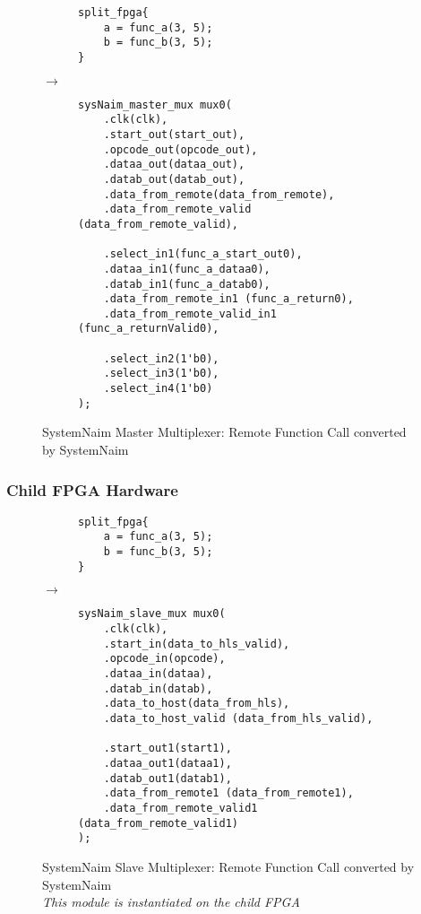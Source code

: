 \begin{figure}[H]
\centering
\begin{subfigure}{0.32\textwidth}
    \centering
    \begin{verbatim}
split_fpga{
    a = func_a(3, 5);
    b = func_b(3, 5);
}
\end{verbatim}
\end{subfigure}%
{\LARGE$\rightarrow$}%
\begin{subfigure}{0.58\textwidth}
    \begin{verbatim}
sysNaim_master_mux mux0(
    .clk(clk),
    .start_out(start_out),
    .opcode_out(opcode_out),
    .dataa_out(dataa_out),
    .datab_out(datab_out),
    .data_from_remote(data_from_remote),
    .data_from_remote_valid (data_from_remote_valid),

    .select_in1(func_a_start_out0),
    .dataa_in1(func_a_dataa0),
    .datab_in1(func_a_datab0),
    .data_from_remote_in1 (func_a_return0),
    .data_from_remote_valid_in1 (func_a_returnValid0),

    .select_in2(1'b0),
    .select_in3(1'b0),
    .select_in4(1'b0)
);
    \end{verbatim}
\end{subfigure}
\caption{SystemNaim Master Multiplexer: Remote Function Call converted by SystemNaim}
\label{sn:rmt_func_call_mst_mux}
\end{figure}

\subsubsection{Child FPGA Hardware}

\begin{figure}[H]
\centering
\begin{subfigure}{0.32\textwidth}
    \centering
    \begin{verbatim}
split_fpga{
    a = func_a(3, 5);
    b = func_b(3, 5);
}
\end{verbatim}
\end{subfigure}%
{\LARGE$\rightarrow$}%
\begin{subfigure}{0.58\textwidth}
    \begin{verbatim}
sysNaim_slave_mux mux0(
    .clk(clk),
    .start_in(data_to_hls_valid),
    .opcode_in(opcode),
    .dataa_in(dataa),
    .datab_in(datab),
    .data_to_host(data_from_hls),
    .data_to_host_valid (data_from_hls_valid),

    .start_out1(start1),
    .dataa_out1(dataa1),
    .datab_out1(datab1),
    .data_from_remote1 (data_from_remote1),
    .data_from_remote_valid1 (data_from_remote_valid1)
);
    \end{verbatim}
\end{subfigure}
\caption{SystemNaim Slave Multiplexer: Remote Function Call converted by SystemNaim \\ \textit{This module is instantiated on the child FPGA}}
\label{sn:rmt_func_call_slv_mux}
\end{figure}


